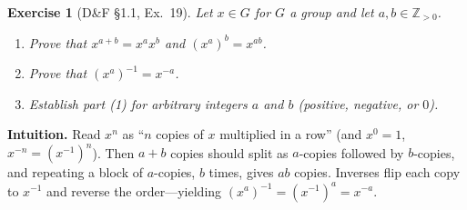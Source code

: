 \documentclass[12pt]{article}
\newtheorem{exercise}[theorem]{Exercise}
\theoremstyle{definition}
\begin{document}
\newpage

\begin{exercise}[D\&F §1.1, Ex.~19]
Let $x\in G$ for $G$ a group and let $a,b\in\mathbb{Z}_{>0}$.
\begin{enumerate}
\item Prove that $x^{a+b}=x^a x^b$ and $(x^a)^b=x^{ab}$.
\item Prove that $(x^a)^{-1}=x^{-a}$.
\item Establish part (1) for arbitrary integers $a$ and $b$ (positive, negative, or $0$).
\end{enumerate}
\end{exercise}

\dotfill

\noindent
\textbf{Intuition.}
Read $x^n$ as “$n$ copies of $x$ multiplied in a row” (and $x^0=1$, $x^{-n}=(x^{-1})^n$).
Then $a+b$ copies should split as $a$-copies followed by $b$-copies, and repeating a block of $a$-copies,
$b$ times, gives $ab$ copies. Inverses flip each copy to $x^{-1}$ and reverse the order—yielding $(x^a)^{-1}=(x^{-1})^a=x^{-a}$.

\dotfill
\end{document}
